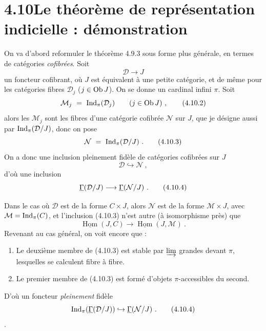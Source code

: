 \section*{4.10\quad Le théorème de représentation indicielle : démonstration}

On va d'abord reformuler le théorème 4.9.3 sous forme plus générale, en termes de catégories \textit{cofibrées}. Soit
\[
\mathcal{D} \longrightarrow J \tag*{(4.10.1)}
\]
un foncteur cofibrant, où $J$ est équivalent à une petite catégorie, et de même pour les catégories fibres $\mathcal{D}_j$ ($j \in \operatorname{Ob} J$). On se donne un cardinal infini $\pi$. Soit
\[
\mathcal{M}_j \ = \ \Ind_\pi(\mathcal{D}_j) \qquad (j \in \Ob J) \ , \tag*{(4.10.2)}
\]
alors les $\mathcal{M}_j$ sont les fibres d'une catégorie cofibrée $\mathcal{N}$ sur $J$, que je désigne aussi par $\mathrm{Ind}_\pi(\mathcal{D}/J)$, donc on pose
\[
\mathcal{N} \ = \ \mathrm{Ind}_\pi(\mathcal{D}/J) \ . \tag*{(4.10.3)}
\]
On a donc une inclusion pleinement fidèle de catégories cofibrées sur $J$
\[
\mathcal{D} \hookrightarrow \mathcal{N} \ ,
\]
d'où une inclusion
\[
\underline{\Gamma}(\mathcal{D}/J) \longrightarrow \underline{\Gamma}(\mathcal{N}/J) \ . \tag*{(4.10.4)}
\]

Dans le cas où $\mathcal{D}$ est de la forme $C \times J$, alors $\mathcal{N}$ est de la forme $\mathcal{M} \times J$, avec $\mathcal{M} = \mathrm{Ind}_\pi(C)$, et l'inclusion (4.10.3) n'est autre (à isomorphisme près) que
\[
\underline{\operatorname{Hom}}(J, C) \longrightarrow \underline{\operatorname{Hom}}(J, \mathcal{M}) \ .
\]
Revenant au cas général, on voit encore que :
\begin{enumerate}[label={}, leftmargin=3em]
\item[1°)] Le deuxième membre de (4.10.3) est stable par $\varinjlim$ grandes devant $\pi$, lesquelles se calculent fibre à fibre.
\item[2°)] Le premier membre de (4.10.3) est formé d'objets $\pi$-accessibles du second.
\end{enumerate}
D'où un foncteur \textit{pleinement} fidèle
\[
\mathrm{Ind}_\pi(\underline{\Gamma}(\mathcal{D}/J)) \hookrightarrow \underline{\Gamma}(\mathcal{N}/J) \ . \tag*{(4.10.4)}
\]
\setcounter{footnote}{103}%
.

